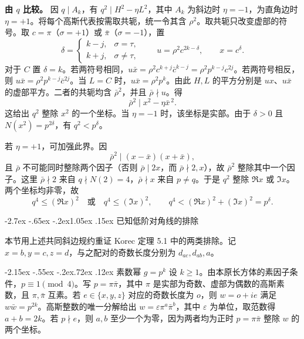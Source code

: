 \documentclass[11pt,a4paper,twoside]{article}
\makeatletter
\numberwithin{equation}{section}
\renewcommand{\section}{\@startsection{section}{1}{\z@}%
  {-2.7ex \@plus -.65ex \@minus -.2ex}{1.05ex \@plus .15ex}%
  {\normalfont\large\bfseries}}
\renewcommand{\subsection}{\@startsection{subsection}{2}{\z@}%
  {-2.15ex \@plus -.55ex \@minus -.2ex}{.72ex \@plus .12ex}%
  {\normalfont\normalsize\bfseries}}
\makeatother
\begin{document}
\textbf{由 \(q\) 比较。} 因 \(q\mid A_k\)，有 \(q^2\mid H^2-\eta L^2\)，其中 \(A_k\) 为斜边时 \(\eta=-1\)，为直角边时 \(\eta=+1\)。将每个高斯代表按需取共轭，统一令其含 \(\rho^2\)。取共轭只改变虚部的符号。取 \(c=\pi\)（\(\sigma=+1\)）或 \(\bar\pi\)（\(\sigma=-1\)），置
\[
\delta=\begin{cases}k-j,&\sigma=\tau,\\ k+j,&\sigma\ne\tau,\end{cases}
\qquad
u=\rho^2c^{2k-\delta},\qquad x=c^\delta .
\]
对于 \(C\) 置 \(\delta=k\)。若两符号相同，\(u\bar x=\rho^2c^{k+j}\bar c^{k-j}=\rho^2p^{k-j}c^{2j}\)。若两符号相反，则 \(u\bar x=\rho^2p^{k-j}\bar c^{2j}\)。当 \(L=C\) 时，\(u\bar x=\rho^2 p^k\)。由此 \(H,L\) 的平方分别是 \(ux\)、\(u\bar x\) 的虚部平方。二者的共轭均含 \(\bar\rho^2\)，并且 \(\bar\rho\nmid u\)。得
\[
\bar\rho^2\mid x^2-\eta\bar x^{\,2}.
\]
这给出 \(q^2\) 整除 \(x^2\) 的一个坐标。当 \(\eta=-1\) 时，该坐标是实部。由于 \(\delta>0\) 且 \(N(x^2)=p^{2\delta}\)，有 \(q^2<p^\delta\)。

若 \(\eta=+1\)，可加强此界。因
\[
\bar\rho^2\mid(x-\bar x)(x+\bar x),
\]
且 \(\bar\rho\) 不可能同时整除两个因子（否则 \(\bar\rho\mid 2x\)，而 \(\bar\rho\nmid2,x\)），故 \(\bar\rho^2\) 整除其中一个因子。这里 \(\bar\rho\nmid2\) 来自 \(q\nmid N(2)=4\)，\(\bar\rho\nmid x\) 来自 \(p\ne q\)。于是 \(q^2\) 整除 \(\Re x\) 或 \(\Im x\)。两个坐标均非零，故
\[
q^4\le(\Re x)^2\quad\text{或}\quad q^4\le(\Im x)^2,\qquad
q^4<(\Re x)^2+(\Im x)^2=p^\delta.
\]

\section{已知低阶对角线的排除}
\label{sec:lower-diagonals}

本节用上述共同斜边规约重证 Korec 定理 5.1 \cite{ref1} 中的两类排除。记 \(x=b,y=c,z=d\)，与之配对的奇数长度分别为 \(d_{ac},d_{ab},a\)。

\subsection{素数幂 \texorpdfstring{\(g=p^k\)}{g=pᵏ}}
设 \(k\ge 1\)。由本原长方体的素因子条件，\(p\equiv1\pmod4\)。写 \(p=\pi\bar\pi\)，其中 \(\pi\) 是实部为奇数、虚部为偶数的高斯素数，且 \(\pi,\bar\pi\) 互素。若 \(e\in\{x,y,z\}\) 对应的奇数长度为 \(o\)，则 \(w=o+ie\) 满足 \(w\bar w=p^{2k}\)。高斯整数的唯一分解给出 \(w=\varepsilon\pi^a\bar\pi^b\)，其中 \(\varepsilon\) 为单位，取范数得 \(a+b=2k\)。若 \(p\nmid e\)，则 \(a,b\) 至少一个为零，因为两者均为正时 \(p=\pi\bar\pi\) 整除 \(w\) 的两个坐标。
\end{document}
